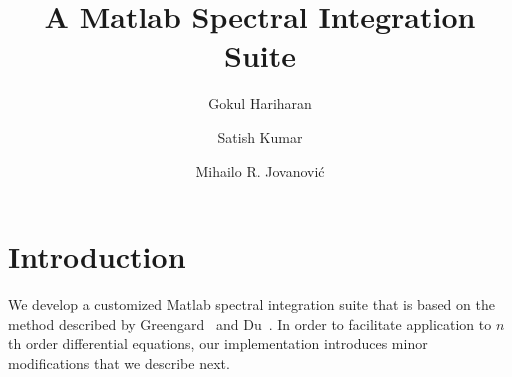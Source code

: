\documentclass[%
secnumarabic,%
 amssymb, amsmath,%
 aps,prf,superscriptaddress,longbibliography
frontmatterverbose,
]{revtex4-2}
\begin{document}
\title{\bf \large A Matlab Spectral Integration Suite}


\author{Gokul Hariharan}
\author{Satish Kumar}
\author{Mihailo R. Jovanovi\'c}

\newcommand{\D}{\mathrm D}
\newcommand{\I}{\mathbf I}
\newcommand{\J}{\mathbf J}
\newcommand{\K}{\mathbf K}
\newcommand{\E}{\mathbf E}
\newcommand{\0}{\mathbf 0}
\newcommand{\T}{\mathbf T}
\newcommand{\R}{\mathbf R}
\newcommand{\DD}[2]{\frac{\partial^2 #1}{\partial #2^2}}
\newcommand{\BB}[1]{\boldsymbol #1}
\newcommand{\hh}[1]{\mathbf{\bar{\text{$#1$}}}}
\newcommand{\HH}[1]{\mathbf{#1}}
\newcommand{\MM}[1]{\mathcal{#1}}
\newcommand{\MMbf}[1]{\mathbfcal{#1}}
\pagebreak
\begin{abstract}

\end{abstract}
\maketitle
\section{Introduction}\label{sec:intro}
We develop a customized Matlab spectral integration suite that is based on the method described by Greengard~\cite{GreSIAM91} and Du~\cite{DuSIAM2016}. In order to facilitate application to $n$th order differential equations, our implementation introduces minor modifications that we describe next. 
\end{document}

